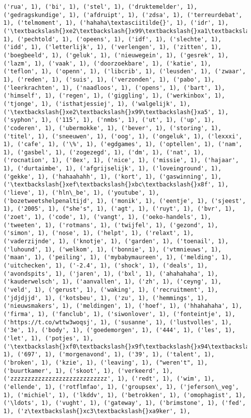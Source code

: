 \documentclass{article}
\begin{document}
\begin{Verbatim}[commandchars=\\\{\}]
('rua', 1), ('bi', 1), ('stel', 1), ('druktemelder', 1), ('gedragskundige', 1), ('afdruipt', 1), ('zdsa', 1), ('terreurdebat', 1), ('telmoment', 1), ('hahaha\textasciitilde{}', 1), ('idr', 1), ('\textbackslash{}xe2\textbackslash{}x99\textbackslash{}xa1\textbackslash{}xe2\textbackslash{}x98\textbackslash{}x86', 1), ('pechtold', 1), ('opeens', 1), ('idf', 1), ('slechte', 1), ('idd', 1), ('letterlijk', 1), ('verlengen', 1), ('zitten', 1), ('boegbeeld', 1), ('geluk', 1), ('nieuwegein', 1), ('gesrek', 1), ('lazm', 1), ('vaak', 1), ('doorzoekbare', 1), ('katie', 1), ('teflon', 1), ('openn', 1), ('libcrib', 1), ('leusden', 1), ('zwaar', 1), ('reden', 1), ('suis', 1), ('verzonden', 1), ('pabo', 1), ('leerkrachten', 1), ('naadloos', 1), ('opens', 1), ('bart', 1), ('himself', 1), ('regen', 1), ('giggling', 1), ('werkinbox', 1), ('tjonge', 1), ('isthatjessiej', 1), ('walgelijk', 1), ('\textbackslash{}xe2\textbackslash{}x99\textbackslash{}xa5', 1), ('syphon', 1), ('115', 1), ('nmbs', 1), ('ut', 1), ('up', 1), ('coderen', 1), ('ubermokke', 1), ('bever', 1), ('storing', 1), ('titel', 1), ('sneeuwen', 1), ('oog', 1), ('ongeluk', 1), ('lexxxi', 1), ('cafe', 1), ('\%', 1), ('egdgames', 1), ('optellen', 1), ('nam', 1), ('gasbel', 1), ('zogezegd', 1), ('dm', 1), ('nat', 1), ('rocnation', 1), ('8ex', 1), ('nice', 1), ('missie', 1), ('hajaar', 1), ('durtaimbe', 1), ('afgrijselijk', 1), ('loveinground', 1), ('gekke', 1), ('hahaahahh', 1), ('kort', 1), ('gaswinning', 1), ('\textbackslash{}xef\textbackslash{}xbc\textbackslash{}x8f', 1), ('lieve', 1), ('hln\_be', 1), ('youtube', 1), ('bozetweetshelpenaltijd', 1), ('monik', 1), ('eentje', 1), ('sjeest', 1), ('2005', 1), ("she's", 1), ('agt', 1), ('ruyt', 1), ('bvr', 1), ('zoet', 1), ('code', 1), ('vangt', 1), ('oeko-handels', 1), ('tweeten', 1), ('rotmans', 1), ('twijfel', 1), ('gezond', 1), ('simon', 1), ('nose', 1), ('helpt', 1), ('relaxt', 1), ('vaderzijnde', 1), ('knotje', 1), ('garden', 1), ('toenail', 1), ('luhound', 1), ('welkom', 1), ('bonnie', 1), ('vtmnieuws', 1), ('maan', 1), ('peiling', 1), ('mybabymaureen', 1), ('melding', 1), ('uitchecken', 1), ('-2.4', 1), ('shock', 1), ('deals', 1), ('avondspits', 1), ('jaren', 1), ('bxl', 1), ('ahahahaha', 1), ('kauderwelsch', 1), ('aanvallen', 1), ('zh', 1), ('ceyng', 1), ('veld', 1), ('gerust', 1), ('waking', 1), ('recruitment', 1), ('jdjdjjd', 1), ('kotsbeu', 1), ('zu', 1), ('hemmings', 1), ('nieuwsmakers', 1), ('meldingen', 1), ('hoef', 1), ('hhahahaha', 1), ('firma', 1), ('fanclub', 1), ('siwonlover', 1), ('fonteintje', 1), ('https://t.co/wttw3woqsj', 1), ('susanne', 1), ('lustvolles', 1), ('3e', 1), ('body', 1), ('goedemorgen', 1), ('444', 1), ('les', 1), ('let', 1), ('potjes', 1), ('\textbackslash{}xf0\textbackslash{}x9f\textbackslash{}x94\textbackslash{}x89', 1), ('697', 1), ('morgenavond', 1), ('39', 1), ('talent', 1), ('broken', 1), ('kzie', 1), ('leaving', 1), ("weren't", 1), ('buurtkamer', 1), ('skoot', 1), ('verkeerd', 1), ('zzzzzzzzzzzzzzzzzzzzzzzzzzzz', 1), ('redt', 1), ('wim', 1), ('ellende', 1), ('rotflmfao', 1), ('groupsex', 1), ('jeferson\_veg', 1), ('michiel', 1), ('lkddv', 1), ('betrokken', 1), ('omophagist', 1), ('\ldots', 1), ('vught', 1), ('gateway', 1), ('brimstone', 1), ('fed', 1), ('z\textbackslash{}xc3\textbackslash{}xa9ker', 1), 
\end{Verbatim}
\end{document}
